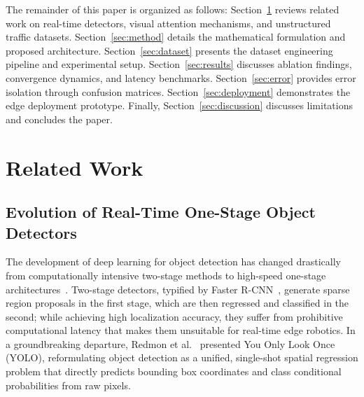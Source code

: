 \documentclass[pdflatex,sn-mathphys]{sn-jnl}
\begin{document}
The remainder of this paper is organized as follows: Section~\ref{sec:related} reviews related work on real-time detectors, visual attention mechanisms, and unstructured traffic datasets. Section~\ref{sec:method} details the mathematical formulation and proposed architecture. Section~\ref{sec:dataset} presents the dataset engineering pipeline and experimental setup. Section~\ref{sec:results} discusses ablation findings, convergence dynamics, and latency benchmarks. Section~\ref{sec:error} provides error isolation through confusion matrices. Section~\ref{sec:deployment} demonstrates the edge deployment prototype. Finally, Section~\ref{sec:discussion} discusses limitations and concludes the paper.

\section{Related Work}\label{sec:related}

\subsection{Evolution of Real-Time One-Stage Object Detectors}
The development of deep learning for object detection has changed drastically from computationally intensive two-stage methods to high-speed one-stage architectures~\cite{redmon2016you,ren2015faster,wang2023yolov7}. Two-stage detectors, typified by Faster R-CNN~\cite{ren2015faster}, generate sparse region proposals in the first stage, which are then regressed and classified in the second; while achieving high localization accuracy, they suffer from prohibitive computational latency that makes them unsuitable for real-time edge robotics. In a groundbreaking departure, Redmon et al.~\cite{redmon2016you} presented You Only Look Once (YOLO), reformulating object detection as a unified, single-shot spatial regression problem that directly predicts bounding box coordinates and class conditional probabilities from raw pixels.
\end{document}
